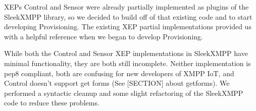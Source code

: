 XEPs Control and Sensor were already partially implemented as plugins of the
SleekXMPP library, so we decided to build off of that existing code and to start
developing Provisioning. The existing XEP partial implementations provided us
with a helpful reference when we began to develop Provisioning.

While both the Control and Sensor XEP implementations in SleekXMPP have minimal
functionality, they are both still incomplete. Neither implementation is pep8
compliant, both are confusing for new developers of XMPP IoT, and Control
doesn’t support get forms (See [SECTION] about getforms). We performed a
syntactic cleanup and some slight refactoring of the SleekXMPP code to reduce
these problems.

